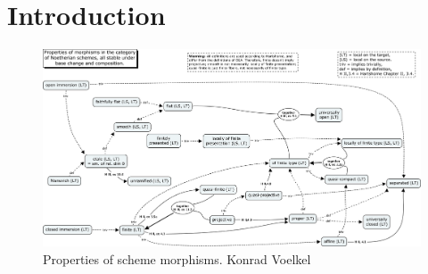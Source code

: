 \documentclass[../main.tex]{subfiles}
\begin{document}
\section{Introduction}\label{sec:Introduction}
\begin{figure}[h!]
\centering
\includegraphics[width=\textwidth]{img/morphisms.png}
\caption{Properties of scheme morphisms. Konrad Voelkel}
\label{fig:Properties of sheme morphims; Konrad Voelkel}
\end{figure}
\end{document}
